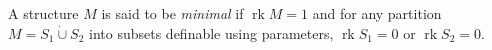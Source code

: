 A structure $M$ is said to be \emph{minimal} if $\operatorname{rk} M = 1$ and for any partition $M = S_1 \dot{\cup} S_2$ into subsets definable using parameters, $\operatorname{rk} S_1 = 0$ or $\operatorname{rk} S_2 = 0$.
